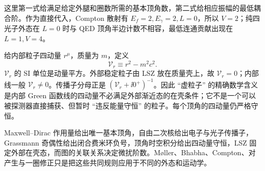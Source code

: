 这里第一式给满足给定外腿和圈数所需的基本顶角数，第二式给相应振幅的最低耦合阶。作为直接代入，Compton 散射有 $E_f=2,E_\gamma=2,L=0$，所以 $V=2$；纯四光子外态在 $L=0$ 时与 QED 顶角半边计数不相容，最低连通贡献出现在 $L=1,V=4$。

给内部粒子四动量 $r^\mu$，质量为 $m$，定义
\begin{equation}
 {
 \mathcal V_r\equiv r^2-m^2c^2.}
 \label{eq:qed-virtuality-definition-dp7}
\end{equation}
$\mathcal V_r$ 的 SI 单位是动量平方。外部稳定粒子由 LSZ 放在质量壳上，故 $\mathcal V_r=0$；内部线一般 $\mathcal V_r\neq0$。传播子分母正是
$(\mathcal V_r+\ii0^+)^{-1}$。因此 ``虚粒子'' 的精确数学含义是内部 Green 函数线的四动量不必满足外部渐近态的在壳条件；它不是一个可以被探测器直接捕获、但暂时 ``违反能量守恒'' 的粒子。每个顶角的四动量仍严格守恒。


Maxwell--Dirac 作用量给出唯一基本顶角，自由二次核给出电子与光子传播子，Grassmann 奇偶性给出闭合费米环负号，顶角时空积分给出四动量守恒，LSZ 固定外部在壳态，而图的关联关系决定微扰阶数。M{\o}ller、Bhabha、Compton、对产生与一圈修正只是把这些共同规则应用于不同的外态和运动学。



